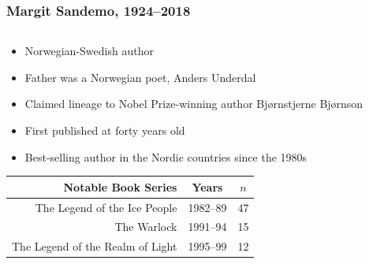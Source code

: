 \begin{frame}
    \frametitle{Margit Sandemo, 1924--2018}
    \begin{columns}[T]
        \begin{column}{0.6\textwidth}
            \begin{itemize}
                \item Norwegian-Swedish author
                \item Father was a Norwegian poet, Anders Underdal
                \item Claimed lineage to Nobel Prize-winning author Bjørnstjerne Bjørnson
                \item First published at forty years old
                \item Best-selling author in the Nordic countries since the 1980s
            \end{itemize}
            \vfill
            \begin{scriptsize}
                \begin{table}
                    \begin{tabular}{rcc}
                        \textbf{Notable Book Series}     & \textbf{Years} & $n$ \\ \midrule
                        The Legend of the Ice People     & 1982--89       & 47  \\
                        The Warlock                      & 1991--94       & 15  \\
                        The Legend of the Realm of Light & 1995--99       & 12
                    \end{tabular}
                \end{table}
            \end{scriptsize}
        \end{column}
        \begin{column}{0.4\textwidth}
            \centering

\end{column}
\end{columns}
\end{frame}
